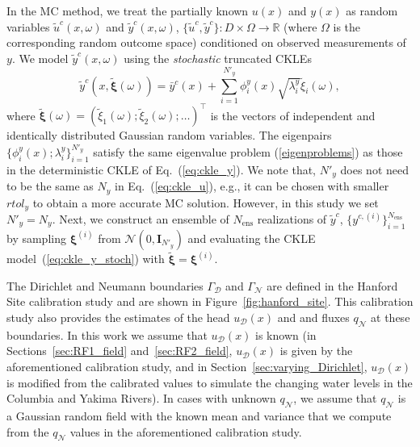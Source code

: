\documentclass{agujournal2019}
\begin{document}
In the MC method, we treat the partially known $u(x)$ and $y(x)$ as random variables $\tilde{u}^c(x,\omega)$ and $\tilde{y}^c(x,\omega)$, $\{ \tilde{u}^c, \tilde{y}^c \} : D \times \Omega \to \mathbb{R}$ (where $\Omega$ is the corresponding random outcome space) conditioned on observed measurements of $y$.
We model $\tilde{y}^c(x,\omega)$ using the \emph{stochastic} truncated CKLEs
%
\begin{equation}
  \label{eq:ckle_y_stoch}
  \tilde{y}^c(x, \tilde{\boldsymbol{\xi}}(\omega)) = \bar{y}^c(x) + \sum_{i=1}^{N'_y} \phi_i^y(x) \sqrt{\lambda_i^y} \tilde{\xi}_i(\omega),
\end{equation}
where $\tilde{\boldsymbol{\xi}}(\omega) = (\tilde{\xi}_1(\omega); \tilde{\xi}_2(\omega); \ldots)^\top$ is the vectors of independent and identically distributed Gaussian random variables. The eigenpairs $\{\phi_i^y(x); \lambda_i^y\}_{i=1}^{N'_y}$ satisfy the same eigenvalue problem (\ref{eigenproblems}) as those in the deterministic CKLE of Eq.~(\ref{eq:ckle_y}). We note that, $N'_y$ does not need to be the same as $N_y$ in Eq.~(\ref{eq:ckle_u}), e.g., it can be chosen with smaller $rtol_y$ to obtain a more accurate MC solution. However, in this study we set $N'_y=N_y$. 
%
Next, we construct an ensemble of $N_{\mathrm{ens}}$ realizations of $\tilde{y}^c$, $\{ {y}^{c,(i)} \}^{N_{\mathrm{ens}}}_{i = 1}$ by sampling $\bm{\xi}^{(i)}$ from $\mathcal{N}(0, \mathbf{I}_{N'_y})$ and evaluating the CKLE model~(\ref{eq:ckle_y_stoch}) with $\tilde{\bm{\xi}} = \bm{\xi}^{(i)}$.

The Dirichlet and Neumann boundaries $\Gamma_\mathcal{D}$ and $\Gamma_\mathcal{N}$ are defined in the Hanford Site calibration study and are shown in Figure~\ref{fig:hanford_site}. This calibration study also provides the estimates of the head $u_\mathcal{D}(x)$ and and fluxes $q_\mathcal{N}$ at these boundaries.
In this work we assume that $u_\mathcal{D}(x)$ is known (in Sections~\ref{sec:RF1_field} and~\ref{sec:RF2_field}, $u_\mathcal{D}(x)$ is given by the aforementioned calibration study, and in Section~\ref{sec:varying_Dirichlet}, $u_\mathcal{D}(x)$ is modified from the calibrated values to simulate the changing water levels in the Columbia and Yakima Rivers).
In cases with unknown $q_\mathcal{N}$, we assume that $q_\mathcal{N}$ is a Gaussian random field with the known mean and variance that we compute from the $q_\mathcal{N}$ values in the aforementioned calibration study. %
\end{document}
